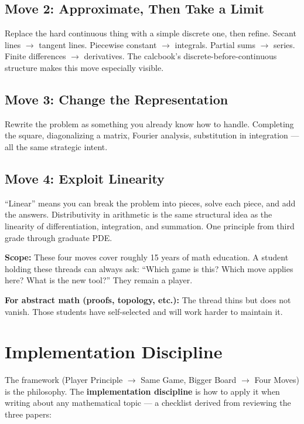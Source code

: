 \documentclass[11pt]{article}
\begin{document}
\subsection{Move 2: Approximate, Then Take a Limit}

Replace the hard continuous thing with a simple discrete one, then refine. Secant lines $\rightarrow$ tangent lines. Piecewise constant $\rightarrow$ integrals. Partial sums $\rightarrow$ series. Finite differences $\rightarrow$ derivatives. The calcbook's discrete-before-continuous structure makes this move especially visible.

\subsection{Move 3: Change the Representation}

Rewrite the problem as something you already know how to handle. Completing the square, diagonalizing a matrix, Fourier analysis, substitution in integration --- all the same strategic intent.

\subsection{Move 4: Exploit Linearity}

``Linear'' means you can break the problem into pieces, solve each piece, and add the answers. Distributivity in arithmetic is the same structural idea as the linearity of differentiation, integration, and summation. One principle from third grade through graduate PDE.

\textbf{Scope:} These four moves cover roughly 15 years of math education. A student holding these threads can always ask: ``Which game is this? Which move applies here? What is the new tool?'' They remain a player.

\textbf{For abstract math (proofs, topology, etc.):} The thread thins but does not vanish. Those students have self-selected and will work harder to maintain it.

\section{Implementation Discipline}

The framework (Player Principle $\rightarrow$ Same Game, Bigger Board $\rightarrow$ Four Moves) is the philosophy. The \textbf{implementation discipline} is how to apply it when writing about any mathematical topic --- a checklist derived from reviewing the three papers:
\end{document}
